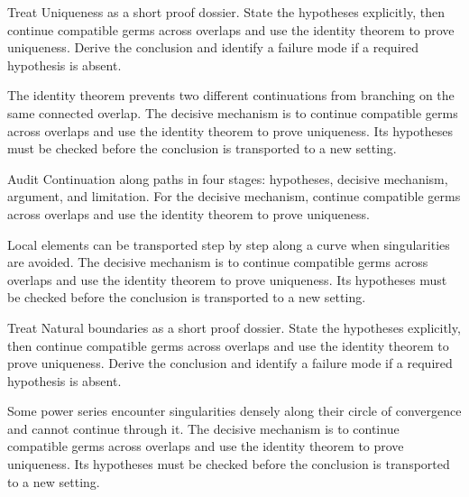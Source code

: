 \begin{problem}\label{prob:iv15-problem-04}
Treat Uniqueness as a short proof dossier. State the hypotheses explicitly, then continue compatible germs across overlaps and use the identity theorem to prove uniqueness. Derive the conclusion and identify a failure mode if a required hypothesis is absent.
\end{problem}
\begin{solution}
The identity theorem prevents two different continuations from branching on the same connected overlap. The decisive mechanism is to continue compatible germs across overlaps and use the identity theorem to prove uniqueness. Its hypotheses must be checked before the conclusion is transported to a new setting.
\end{solution}

\begin{problem}\label{prob:iv15-problem-05}
Audit Continuation along paths in four stages: hypotheses, decisive mechanism, argument, and limitation. For the decisive mechanism, continue compatible germs across overlaps and use the identity theorem to prove uniqueness.
\end{problem}
\begin{solution}
Local elements can be transported step by step along a curve when singularities are avoided. The decisive mechanism is to continue compatible germs across overlaps and use the identity theorem to prove uniqueness. Its hypotheses must be checked before the conclusion is transported to a new setting.
\end{solution}

\begin{problem}\label{prob:iv15-problem-06}
Treat Natural boundaries as a short proof dossier. State the hypotheses explicitly, then continue compatible germs across overlaps and use the identity theorem to prove uniqueness. Derive the conclusion and identify a failure mode if a required hypothesis is absent.
\end{problem}
\begin{solution}
Some power series encounter singularities densely along their circle of convergence and cannot continue through it. The decisive mechanism is to continue compatible germs across overlaps and use the identity theorem to prove uniqueness. Its hypotheses must be checked before the conclusion is transported to a new setting.
\end{solution}

